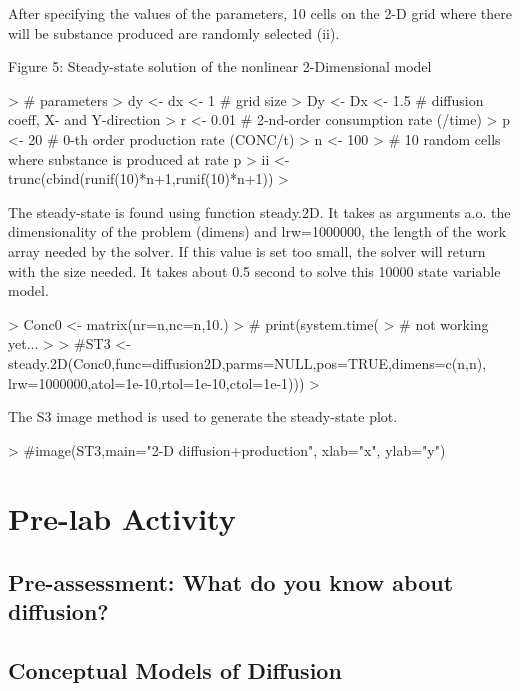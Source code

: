 \documentclass{article}
\begin{document}
After specifying the values of the parameters, 10 cells on the 2-D grid where there will be
substance produced are randomly selected (ii).


Figure 5: Steady-state solution of the nonlinear 2-Dimensional model

\begin{Schunk}
\begin{Sinput}
> # parameters
> dy <- dx <- 1 # grid size
> Dy <- Dx <- 1.5 # diffusion coeff, X- and Y-direction
> r <- 0.01 # 2-nd-order consumption rate (/time)
> p <- 20 # 0-th order production rate (CONC/t)
> n <- 100
> # 10 random cells where substance is produced at rate p
> ii <- trunc(cbind(runif(10)*n+1,runif(10)*n+1))
> 
\end{Sinput}
\end{Schunk}
The steady-state is found using function steady.2D. It takes as arguments a.o. the dimensionality
of the problem (dimens) and lrw=1000000, the length of the work array needed by
the solver. If this value is set too small, the solver will return with the size needed.
It takes about 0.5 second to solve this 10000 state variable model.

\begin{Schunk}
\begin{Sinput}
> Conc0 <- matrix(nr=n,nc=n,10.)
> # print(system.time(
> # not working yet...
> 
> #ST3 <- steady.2D(Conc0,func=diffusion2D,parms=NULL,pos=TRUE,dimens=c(n,n), lrw=1000000,atol=1e-10,rtol=1e-10,ctol=1e-1)))
> 
\end{Sinput}
\end{Schunk}


The S3 image method is used to generate the steady-state plot.

\begin{Schunk}
\begin{Sinput}
> #image(ST3,main="2-D diffusion+production", xlab="x", ylab="y")
\end{Sinput}
\end{Schunk}

\section{Pre-lab Activity}

\subsection{Pre-assessment: What do you know about diffusion?}

\subsection{Conceptual Models of Diffusion}
\end{document}
